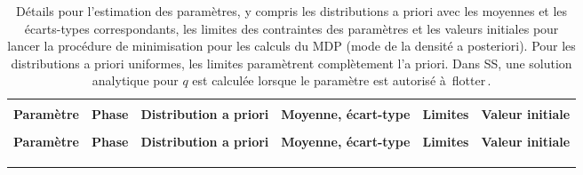 \documentclass[11pt]{book}
\def\bfTh{{\bf \Theta}}%
\newcommand{\comment}[1]{}                    %
\newcommand{\angL}{\guillemotleft\,}
\newcommand{\angR}{\,\guillemotright}
\def\bfTh{{\bf \Theta}}          %
\newcommand{\eref}[1]{(\ref{#1})}
\begin{document}

\begin{longtable}{L{1in}C{1.0in}C{1.0in}C{1.0in}C{1.0in}C{1.4in}}
\caption{D\'{e}tails pour l'estimation des param\`{e}tres, y compris les distributions a priori avec les moyennes et les \'{e}carts-types correspondants, les limites des contraintes des param\`{e}tres et les valeurs initiales pour lancer la proc\'{e}dure de minimisation pour les calculs du MDP (mode de la densit\'{e} a posteriori). Pour les distributions a priori uniformes, les limites param\`{e}trent compl\`{e}tement l'a priori. Dans SS, une solution analytique pour $q$ est calcul\'{e}e lorsque le param\`{e}tre est autoris\'{e} \`{a} \angL flotter\angR{}.}
\comment{
}
\label{tab:priors}
\\ \hline\\[-2.2ex]
\textbf{Param\`{e}tre} & \textbf{Phase} & \textbf{Distribution a priori} & \textbf{Moyenne, \'{e}cart-type} & \textbf{Limites} & \textbf{Valeur initiale}
\\[0.2ex]\hline\\[-1.5ex] \endfirsthead \hline
\textbf{Param\`{e}tre} & \textbf{Phase} & \textbf{Distribution a priori} & \textbf{Moyenne, \'{e}cart-type} & \textbf{Limites} & \textbf{Valeur initiale}
\\[0.2ex]\hline\\[-1.5ex] \endhead
\hline\\[-2.2ex]   \endfoot  \hline \endlastfoot  %


\end{longtable}
\end{document}
